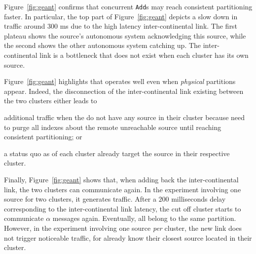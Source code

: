 \begin{asparadesc}
\noindent Figure~\ref{fig:geant} confirms that concurrent
\texttt{Add}s may reach consistent partitioning faster. In particular,
the top part of Figure~\ref{fig:geant} depicts a slow down in traffic
around $300$ ms due to the high latency inter-continental link. The
first plateau shows the source's autonomous system acknowledging this
source, while the second shows the other autonomous system catching
up.  The inter-continental link is a bottleneck that does not exist
when each cluster has its own source.

\noindent Figure~\ref{fig:geant} highlights that \NAME operates well
even when \emph{physical} partitions appear. Indeed, the disconnection
of the inter-continental link existing between the two clusters
either leads to 
\begin{inparaenum}[(i)]
\item additional traffic when the \processes do not have any source in
  their cluster because \processes need to purge all indexes about the
  remote unreachable source until reaching consistent partitioning; or
  \item a status quo as \processes of each 
  cluster already target the source in their respective cluster.
\end{inparaenum}

\noindent Finally, Figure~\ref{fig:geant} shows that, when adding back the
inter-continental link, the two clusters can communicate again. In the
experiment involving one source for two clusters, it generates
traffic. After a $200$ milliseconds delay corresponding to the inter-continental link
latency, the cut off cluster starts to communicate $\alpha$ messages
again. Eventually, all \processes belong to the same
partition. However, in the experiment involving one source \emph{per}
cluster, the new link does not trigger noticeable traffic, for
\processes already know their closest source located in their cluster.

\end{asparadesc}

